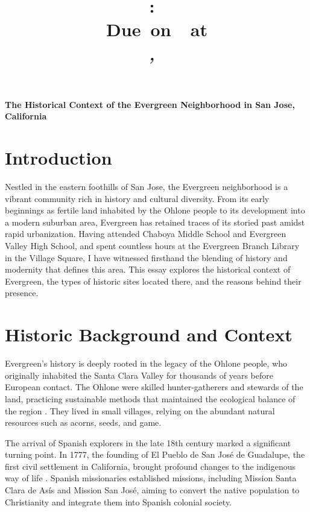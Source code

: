 \documentclass[12pt]{article}
\title{
	\vspace{2in}
	\textmd{\textbf{\hmwkClass:\ \hmwkTitle}}\\
	\normalsize\vspace{0.1in}\small{Due\ on\ \hmwkDueDate\ at \hmwkDueTime}\\
	\vspace{0.1in}\large{\textit{\hmwkClassInstructor,\ \hmwkClassTime}}
	\vspace{3in}
}
\author{\textbf{\hmwkAuthorName}}
\date{\hmwkCompletionDate}
\begin{document}
\maketitle

\pagebreak

\doublespacing

\textbf{\Large The Historical Context of the Evergreen Neighborhood in San Jose, California}


\section*{Introduction}

Nestled in the eastern foothills of San Jose, the Evergreen neighborhood is a vibrant community rich in history and cultural diversity. From its early beginnings as fertile land inhabited by the Ohlone people to its development into a modern suburban area, Evergreen has retained traces of its storied past amidst rapid urbanization. Having attended Chaboya Middle School and Evergreen Valley High School, and spent countless hours at the Evergreen Branch Library in the Village Square, I have witnessed firsthand the blending of history and modernity that defines this area. This essay explores the historical context of Evergreen, the types of historic sites located there, and the reasons behind their presence.

\section*{Historic Background and Context}

Evergreen's history is deeply rooted in the legacy of the Ohlone people, who originally inhabited the Santa Clara Valley for thousands of years before European contact. The Ohlone were skilled hunter-gatherers and stewards of the land, practicing sustainable methods that maintained the ecological balance of the region \cite{anderson2013tending}. They lived in small villages, relying on the abundant natural resources such as acorns, seeds, and game.

The arrival of Spanish explorers in the late 18th century marked a significant turning point. In 1777, the founding of El Pueblo de San José de Guadalupe, the first civil settlement in California, brought profound changes to the indigenous way of life \cite{milliken1995time}. Spanish missionaries established missions, including Mission Santa Clara de Asís and Mission San José, aiming to convert the native population to Christianity and integrate them into Spanish colonial society.
\end{document}
